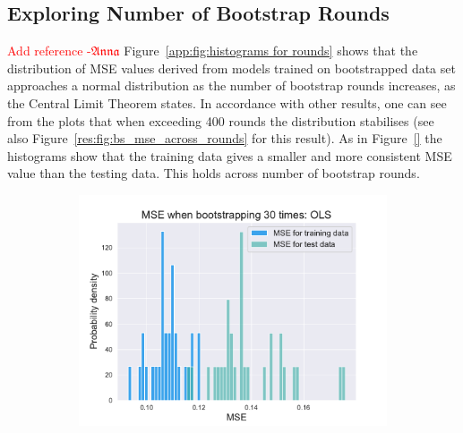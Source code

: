 \documentclass[twocolumn,english,notitlepage]{article}
\newcommand{\comment}[1]{\textcolor{red}{#1}}
\newcommand{\Anna}{$\mathfrak{Anna}$}
\begin{document}
\begin{appendices}
    \section{Exploring Number of Bootstrap Rounds} \label{app:sec:BS rounds}
        \comment{Add reference -\Anna}
         Figure~\ref{app:fig:histograms for rounds} shows that the distribution of MSE values derived from models trained on bootstrapped data set approaches a normal distribution as the number of bootstrap rounds increases, as the Central Limit Theorem states. In accordance with other results, one can see from the plots that when exceeding 400 rounds the distribution stabilises (see also Figure~\ref{res:fig:bs_mse_across_rounds} for this result). As in Figure~\ref{} the histograms show that the training data gives a smaller and more consistent MSE value than the testing data. This holds across number of bootstrap rounds.
        \begin{figure}
            \begin{subfigure}{.5\textwidth}
                \centering
                \includegraphics[width=\linewidth]{BS_hist_bootstraped_30_rounds_of_degree_7.pdf}
                \caption{}
                \label{app:fig:histograms for rounds:30}
                \end{subfigure}
            \hfill
            \begin{subfigure}{.5\textwidth}
                \centering

\end{subfigure}
\end{figure}
\end{appendices}
\end{document}
